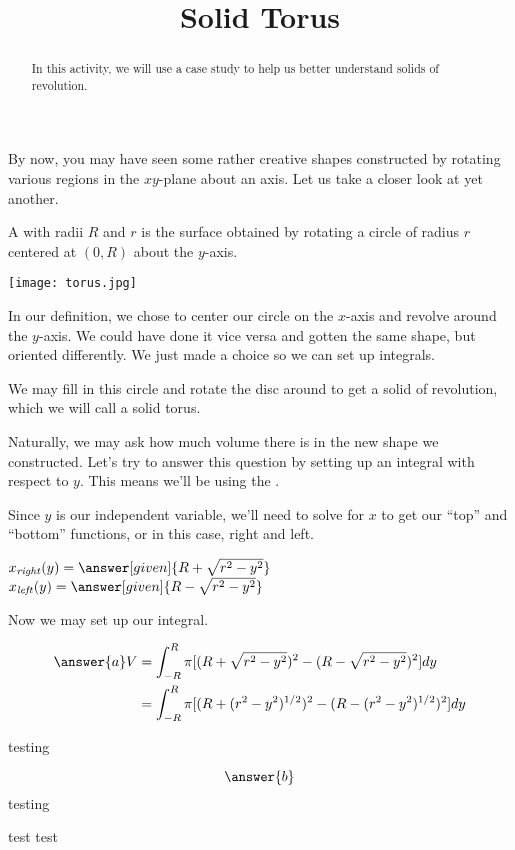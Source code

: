 \documentclass{ximera}
\title{Solid Torus}
\begin{document}
\begin{abstract}
In this activity, we will use a case study to help us better understand solids of revolution.
\end{abstract}
\maketitle

By now, you may have seen some rather creative shapes constructed by rotating various regions in the $xy$-plane about an axis. Let us take a closer look at yet another.
\begin{definition}
	A  with radii $R$ and $r$ is the surface obtained by rotating a circle of radius $r$ centered at $(0,R)$ about the $y$-axis.
\end{definition}

\begin{image}
	\label{torus}
	\texttt{[image: torus.jpg]}
\end{image}

\begin{remark}
	In our definition, we chose to center our circle on the $x$-axis and revolve around the $y$-axis. We could have done it vice versa and gotten the same shape, but oriented differently. We just made a choice so we can set up integrals.
\end{remark} 

We may fill in this circle and rotate the disc around to get a solid of revolution, which we will call a solid torus.

\begin{exercise}
	Naturally, we may ask how much volume there is in the new shape we constructed. Let's try to answer this question by setting up an integral with respect to $y$. This means we'll be using the  .
	
	Since $y$ is our independent variable, we'll need to solve for $x$ to get our ``top'' and ``bottom'' functions, or in this case, right and left.
	
	$x_{\mathit{right}}(y) = \answer[given]{R+\sqrt{r^2-y^2}}$
	$x_{\mathit{left}}(y) = \answer[given]{R-\sqrt{r^2-y^2}}$
	
	Now we may set up our integral.
	 \begin{prompt}
	\begin{align*}
		\answer{a}
		V  &= \int_{-R}^{R} \pi [ (R+\sqrt{r^2-y^2})^{2}-(R-\sqrt{r^2-y^2})^{2}] dy \\
		&= \int_{-R}^{R} \pi [ (R+(r^2-y^2)^{1/2})^{2}-(R-(r^2-y^2)^{1/2})^{2}] dy
	\end{align*}

	testing
	\end{prompt}
		\begin{prompt}
			$$
			\answer{b}$$
			testing
		\end{prompt}
	test test
\end{exercise}
\end{document}
